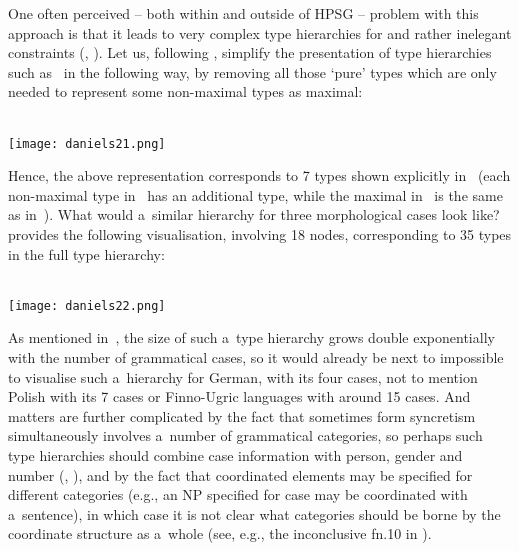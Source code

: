 \documentclass[output=paper]{langsci/langscibook}
\begin{document}
One often perceived – both within and outside of HPSG – problem with this approach is that it leads to very complex type hierarchies for  and rather inelegant constraints (\citealt[272]{sag:02}, \citealt[63–66]{dal:kin:sad:09}).  Let us, following \citealt{dani:01}, simplify the presentation of type hierarchies such as~ in the following way, by removing all those ‘pure’ types which are only needed to represent some non-maximal types as maximal:
\begin{examples}
\item\label{daniels21} \mbox{}\\\texttt{[image: daniels21.png]}
\end{examples}
Hence, the above representation corresponds to 7 types shown explicitly in~ (each non-maximal type in~ has an additional  type, while the maximal  in~ is the same as  in~).  What would a~similar hierarchy for three morphological cases look like?  \citealt[143]{dani:01} provides the following visualisation, involving 18 nodes, corresponding to 35 types in the full type hierarchy:
\pagebreak
\begin{examples}
\item\label{daniels22} \mbox{}\\\texttt{[image: daniels22.png]}
\end{examples}
As mentioned in~\citealt[225]{lev:pol:01}, the size of such a~type hierarchy grows double exponentially with the number of grammatical cases, so it would already be next to impossible to visualise such a~hierarchy for German, with its four cases, not to mention Polish with its 7 cases or Finno-Ugric languages with around 15 cases.  And matters are further complicated by the fact that sometimes form syncretism simultaneously involves a~number of grammatical categories, so perhaps such type hierarchies should combine case information with person, gender and number (\citealt[145]{dani:01}, \citealt{Crysmann2005c}), and by the fact that coordinated elements may be specified for different categories (e.g., an NP specified for case may be coordinated with a~sentence), in which case it is not clear what categories should be borne by the coordinate structure as a~whole (see, e.g., the inconclusive fn.10 in \citealt[277]{sag:02}).
\end{document}

